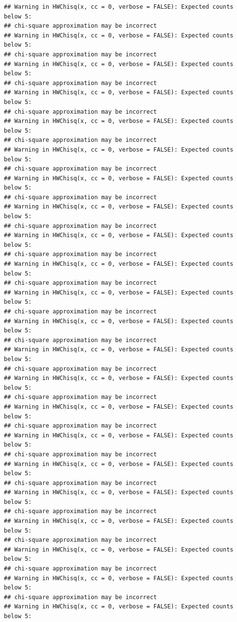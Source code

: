 \documentclass[
]{article}
\begin{document}
\begin{verbatim}
## Warning in HWChisq(x, cc = 0, verbose = FALSE): Expected counts below 5:
## chi-square approximation may be incorrect
## Warning in HWChisq(x, cc = 0, verbose = FALSE): Expected counts below 5:
## chi-square approximation may be incorrect
## Warning in HWChisq(x, cc = 0, verbose = FALSE): Expected counts below 5:
## chi-square approximation may be incorrect
## Warning in HWChisq(x, cc = 0, verbose = FALSE): Expected counts below 5:
## chi-square approximation may be incorrect
## Warning in HWChisq(x, cc = 0, verbose = FALSE): Expected counts below 5:
## chi-square approximation may be incorrect
## Warning in HWChisq(x, cc = 0, verbose = FALSE): Expected counts below 5:
## chi-square approximation may be incorrect
## Warning in HWChisq(x, cc = 0, verbose = FALSE): Expected counts below 5:
## chi-square approximation may be incorrect
## Warning in HWChisq(x, cc = 0, verbose = FALSE): Expected counts below 5:
## chi-square approximation may be incorrect
## Warning in HWChisq(x, cc = 0, verbose = FALSE): Expected counts below 5:
## chi-square approximation may be incorrect
## Warning in HWChisq(x, cc = 0, verbose = FALSE): Expected counts below 5:
## chi-square approximation may be incorrect
## Warning in HWChisq(x, cc = 0, verbose = FALSE): Expected counts below 5:
## chi-square approximation may be incorrect
## Warning in HWChisq(x, cc = 0, verbose = FALSE): Expected counts below 5:
## chi-square approximation may be incorrect
## Warning in HWChisq(x, cc = 0, verbose = FALSE): Expected counts below 5:
## chi-square approximation may be incorrect
## Warning in HWChisq(x, cc = 0, verbose = FALSE): Expected counts below 5:
## chi-square approximation may be incorrect
## Warning in HWChisq(x, cc = 0, verbose = FALSE): Expected counts below 5:
## chi-square approximation may be incorrect
## Warning in HWChisq(x, cc = 0, verbose = FALSE): Expected counts below 5:
## chi-square approximation may be incorrect
## Warning in HWChisq(x, cc = 0, verbose = FALSE): Expected counts below 5:
## chi-square approximation may be incorrect
## Warning in HWChisq(x, cc = 0, verbose = FALSE): Expected counts below 5:
## chi-square approximation may be incorrect
## Warning in HWChisq(x, cc = 0, verbose = FALSE): Expected counts below 5:
## chi-square approximation may be incorrect
## Warning in HWChisq(x, cc = 0, verbose = FALSE): Expected counts below 5:
## chi-square approximation may be incorrect
## Warning in HWChisq(x, cc = 0, verbose = FALSE): Expected counts below 5:
## chi-square approximation may be incorrect
## Warning in HWChisq(x, cc = 0, verbose = FALSE): Expected counts below 5:

\end{verbatim}
\end{document}
